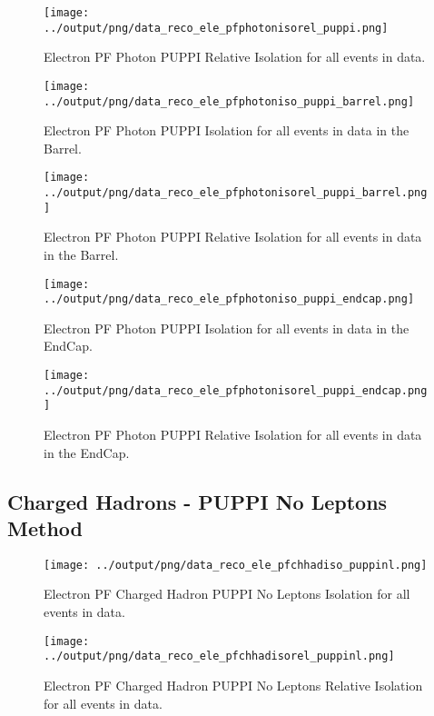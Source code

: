 \documentclass[11pt]{book}
\begin{document}
\begin{figure}[htb]
\centering
\texttt{[image: ../output/png/data\_reco\_ele\_pfphotonisorel\_puppi.png]}
\caption{Electron PF Photon PUPPI Relative Isolation for all events in data.}
\label{fig:data_ele_pfphotonisorel_puppi}
\end{figure}

\begin{figure}[htb]
\centering
\texttt{[image: ../output/png/data\_reco\_ele\_pfphotoniso\_puppi\_barrel.png]}
\caption{Electron PF Photon PUPPI Isolation for all events in data in the Barrel.}
\label{fig:data_ele_pfphotoniso_puppi_barrel}
\end{figure}

\begin{figure}[htb]
\centering
\texttt{[image: ../output/png/data\_reco\_ele\_pfphotonisorel\_puppi\_barrel.png]}
\caption{Electron PF Photon PUPPI Relative Isolation for all events in data in the Barrel.}
\label{fig:data_ele_pfphotonisorel_puppi_barrel}
\end{figure}

\begin{figure}[htb]
\centering
\texttt{[image: ../output/png/data\_reco\_ele\_pfphotoniso\_puppi\_endcap.png]}
\caption{Electron PF Photon PUPPI Isolation for all events in data in the EndCap.}
\label{fig:data_ele_pfphotoniso_puppi_endcap}
\end{figure}

\begin{figure}[htb]
\centering
\texttt{[image: ../output/png/data\_reco\_ele\_pfphotonisorel\_puppi\_endcap.png]}
\caption{Electron PF Photon PUPPI Relative Isolation for all events in data in the EndCap.}
\label{fig:data_ele_pfphotonisorel_puppi_endcap}
\end{figure}
\clearpage

\subsection{Charged Hadrons - PUPPI No Leptons Method}
\begin{figure}[htb]
\centering
\texttt{[image: ../output/png/data\_reco\_ele\_pfchhadiso\_puppinl.png]}
\caption{Electron PF Charged Hadron PUPPI No Leptons Isolation for all events in data.}
\label{fig:data_ele_pfchhadiso_puppinl}
\end{figure}

\begin{figure}[htb]
\centering
\texttt{[image: ../output/png/data\_reco\_ele\_pfchhadisorel\_puppinl.png]}
\caption{Electron PF Charged Hadron PUPPI No Leptons Relative Isolation for all events in data.}
\label{fig:data_ele_pfchhadisorel_puppinl}
\end{figure}
\end{document}
